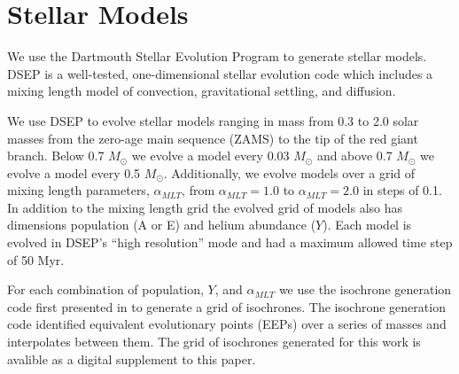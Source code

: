 \section{Stellar Models}\label{sec:modeling}
We use the Dartmouth Stellar Evolution Program \citep[DSEP, ][]{Dotter2008} to
generate stellar models. DSEP is a well-tested, one-dimensional stellar
evolution code which includes a mixing length model of convection,
gravitational settling, and diffusion.

We use DSEP to evolve stellar models ranging in mass from 0.3 to 2.0 solar
masses from the zero-age main sequence (ZAMS) to the tip of the red giant
branch. Below 0.7 $M_{\odot}$ we evolve a model every 0.03 $M_{\odot}$ and
above 0.7 $M_{\odot}$ we evolve a model every 0.5 $M_{\odot}$. Additionally, we
evolve models over a grid of mixing length parameters, $\alpha_{MLT}$, from
$\alpha_{MLT} = 1.0$ to $\alpha_{MLT} = 2.0$ in steps of 0.1. In addition to the
mixing length grid the evolved grid of models also has dimensions population (A
or E) and helium abundance ($Y$). Each model is evolved in DSEP's ``high
resolution'' mode and had a maximum allowed time step of 50 Myr. 

For each combination of population, $Y$, and $\alpha_{MLT}$ we use the
isochrone generation code first presented in \citet{Dotter2016} to generate a
grid of isochrones. The isochrone generation code identified equivalent
evolutionary points (EEPs) over a series of masses and interpolates between
them. {\color{blue} The grid of isochrones generated for this work is avalible
as a digital supplement to this paper.}

